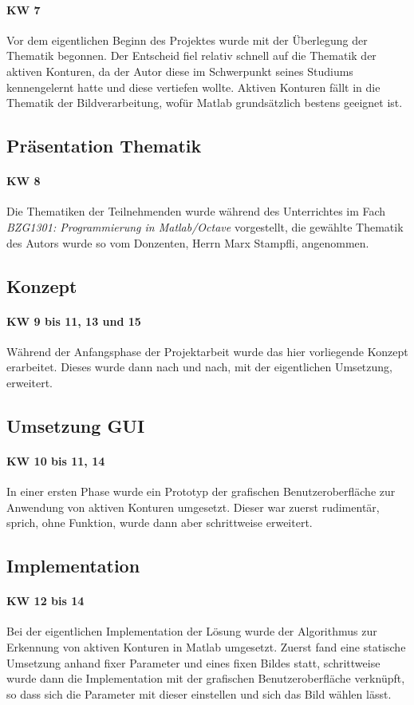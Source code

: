 \paragraph{KW 7}
Vor dem eigentlichen Beginn des Projektes wurde mit der Überlegung der Thematik begonnen. Der Entscheid fiel relativ schnell auf die Thematik der aktiven Konturen, da der Autor diese im Schwerpunkt seines Studiums kennengelernt hatte und diese vertiefen wollte. Aktiven Konturen fällt in die Thematik der Bildverarbeitung, wofür Matlab grundsätzlich bestens geeignet ist.

\subsection{Präsentation Thematik}
\label{subsec:topicpres}
\paragraph{KW 8}
Die Thematiken der Teilnehmenden wurde während des Unterrichtes im Fach \textit{BZG1301: Programmierung in Matlab/Octave} vorgestellt, die gewählte Thematik des Autors wurde so vom Donzenten, Herrn Marx Stampfli, angenommen.

\subsection{Konzept}
\label{subsec:concept}
\paragraph{KW 9 bis 11, 13 und 15}
Während der Anfangsphase der Projektarbeit wurde das hier vorliegende Konzept erarbeitet. Dieses wurde dann nach und nach, mit der eigentlichen Umsetzung, erweitert.

\subsection{Umsetzung GUI}
\label{subsec:gui}
\paragraph{KW 10 bis 11, 14}
In einer ersten Phase wurde ein Prototyp der grafischen Benutzeroberfläche zur Anwendung von aktiven Konturen umgesetzt. Dieser war zuerst rudimentär, sprich, ohne Funktion, wurde dann aber schrittweise erweitert.

\subsection{Implementation}
\label{subsec:impl}
\paragraph{KW 12 bis 14}
Bei der eigentlichen Implementation der Lösung wurde der Algorithmus zur Erkennung von aktiven Konturen in Matlab umgesetzt. Zuerst fand eine statische Umsetzung anhand fixer Parameter und eines fixen Bildes statt, schrittweise wurde dann die Implementation mit der grafischen Benutzeroberfläche verknüpft, so dass sich die Parameter mit dieser einstellen und sich das Bild wählen lässt.
